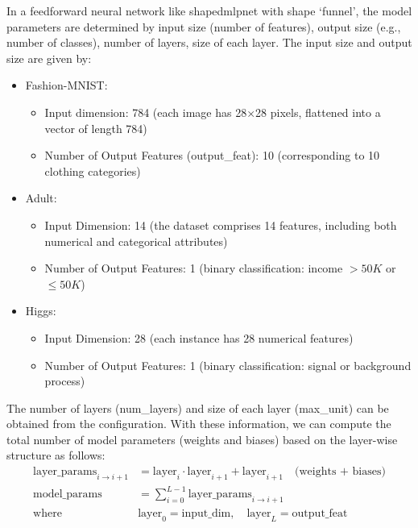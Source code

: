 In a feedforward neural network like shapedmlpnet with shape `funnel', the model parameters are determined by input size (number of features), output size (e.g., number of classes), number of layers, size of each layer.
The input size and output size are given by:
\begin{itemize}
    \item Fashion-MNIST:
    \begin{itemize}
        \item Input dimension: 784 (each image has 28×28 pixels, flattened into a vector of length 784)
        \item Number of Output Features (output\_feat): 10 (corresponding to 10 clothing categories)
    \end{itemize}
    \item Adult:
    \begin{itemize}
        \item Input Dimension: 14 (the dataset comprises 14 features, including both numerical and categorical attributes)
        \item Number of Output Features: 1 (binary classification: income $>50K$ or $\leq50K$)
    \end{itemize}
    \item Higgs: 
    \begin{itemize}
        \item Input Dimension: 28 (each instance has 28 numerical features)
        \item Number of Output Features: 1 (binary classification: signal or background process)
    \end{itemize}
\end{itemize}
The number of layers (num\_layers) and size of each layer (max\_unit) can be obtained from the configuration. With these information, we can compute the total number of model parameters (weights and biases) based on the layer-wise structure as follows:
\begin{align}
\text{layer\_params}_{i \to i+1} &= \text{layer}_i \cdot \text{layer}_{i+1} + \text{layer}_{i+1} \quad \text{(weights + biases)} \\
\text{model\_params} &= \sum_{i=0}^{L - 1} \text{layer\_params}_{i \to i+1} \\
\text{where} \quad &\text{layer}_0 = \text{input\_dim}, \quad \text{layer}_L = \text{output\_feat}
\end{align}

